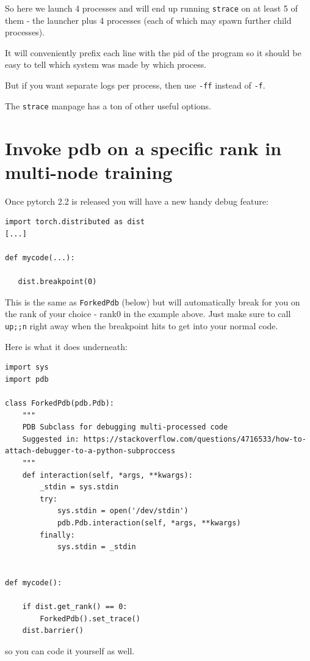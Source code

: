 \documentclass[
]{report}
\begin{document}
So here we launch 4 processes and will end up running \texttt{strace} on
at least 5 of them - the launcher plus 4 processes (each of which may
spawn further child processes).

It will conveniently prefix each line with the pid of the program so it
should be easy to tell which system was made by which process.

But if you want separate logs per process, then use \texttt{-ff} instead
of \texttt{-f}.

The \texttt{strace} manpage has a ton of other useful options.

\section{Invoke pdb on a specific rank in multi-node
training}\label{invoke-pdb-on-a-specific-rank-in-multi-node-training}

Once pytorch 2.2 is released you will have a new handy debug feature:

\begin{verbatim}
import torch.distributed as dist
[...]

def mycode(...):

   dist.breakpoint(0)
\end{verbatim}

This is the same as \texttt{ForkedPdb} (below) but will automatically
break for you on the rank of your choice - rank0 in the example above.
Just make sure to call \texttt{up;;n} right away when the breakpoint
hits to get into your normal code.

Here is what it does underneath:

\begin{verbatim}
import sys
import pdb

class ForkedPdb(pdb.Pdb):
    """
    PDB Subclass for debugging multi-processed code
    Suggested in: https://stackoverflow.com/questions/4716533/how-to-attach-debugger-to-a-python-subproccess
    """
    def interaction(self, *args, **kwargs):
        _stdin = sys.stdin
        try:
            sys.stdin = open('/dev/stdin')
            pdb.Pdb.interaction(self, *args, **kwargs)
        finally:
            sys.stdin = _stdin


def mycode():

    if dist.get_rank() == 0:
        ForkedPdb().set_trace()
    dist.barrier()
\end{verbatim}

so you can code it yourself as well.
\end{document}
